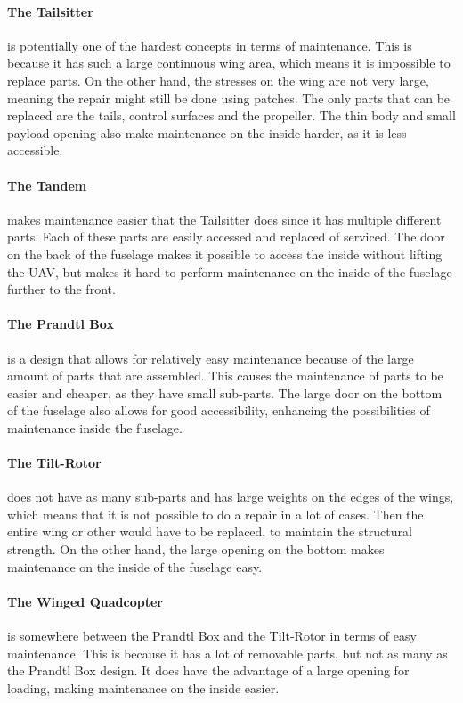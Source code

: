 \paragraph{The Tailsitter} is potentially one of the hardest concepts in terms of maintenance. This is because it has such a large continuous wing area, which means it is impossible to replace parts. On the other hand, the stresses on the wing are not very large, meaning the repair might still be done using patches. The only parts that can be replaced are the tails, control surfaces and the propeller. The thin body and small payload opening also make maintenance on the inside harder, as it is less accessible. 


\paragraph{The Tandem} makes maintenance easier that the Tailsitter does since  it has multiple different parts. Each of these parts are easily accessed and replaced of serviced. The door on the back of the fuselage makes it possible to access the inside without lifting the UAV, but makes it hard to perform maintenance on the inside of the fuselage further to the front. 

\paragraph{The Prandtl Box} is a design that allows for relatively easy maintenance because of the large amount of parts that are assembled. This causes the maintenance of parts to be easier and cheaper, as they have small sub-parts. The large door on the bottom of the fuselage also allows for good accessibility, enhancing the possibilities of maintenance inside the fuselage.

\paragraph{The Tilt-Rotor} does not have as many sub-parts and has large weights on the edges of the wings, which means that it is not possible to do a repair in a lot of cases. Then the entire wing or other would have to be replaced, to maintain the structural strength. On the other hand, the large opening on the bottom makes maintenance on the inside of the fuselage easy.

\paragraph{The Winged Quadcopter} is somewhere between the Prandtl Box and the Tilt-Rotor in terms of easy maintenance. This is because it has a lot of removable parts, but not as many as the Prandtl Box design. It does have the advantage of a large opening for loading, making maintenance on the inside easier.


